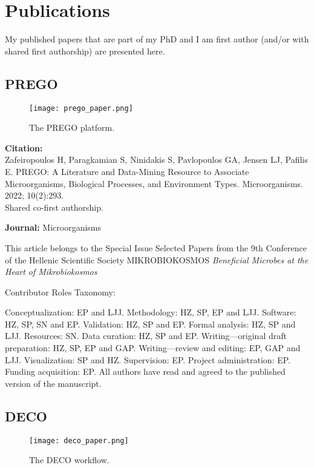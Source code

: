 \chapter{Publications}
\label{app:publications}

My published papers that are part of my PhD and I am first author (and/or with shared first authorship) are
presented here.
\section{PREGO}

\begin{figure}[hbt!] 
    \centering\texttt{[image: prego\_paper.png]}
\caption{The PREGO platform.}
    \label{fig:prego_paper}
\end{figure}

\textbf{Citation:} \\ 
Zafeiropoulos H, Paragkamian S, Ninidakis S, Pavlopoulos GA, Jensen LJ, Pafilis E. PREGO: A Literature and Data-Mining Resource to Associate Microorganisms, Biological Processes, and Environment Types. Microorganisms. 2022; 10(2):293. \\ 
Shared co-first authorship.

\textbf{Journal:} Microorganisms

This article belongs to the Special Issue Selected Papers from the 9th Conference of the Hellenic Scientific Society MIKROBIOKOSMOS \textit{Beneficial Microbes at the Heart of Mikrobiokosmos}

Contributor Roles Taxonomy:

Conceptualization: EP and LJJ.
Methodology: HZ, SP, EP and LJJ.
Software: HZ, SP, SN and EP.
Validation: HZ, SP and EP.
Formal analysis: HZ, SP and LJJ.
Resources: SN.
Data curation: HZ, SP and EP.
Writing—original draft preparation: HZ, SP, EP and GAP.
Writing—review and editing: EP, GAP and LJJ.
Visualization: SP and HZ.
Supervision: EP.
Project administration: EP.
Funding acquisition: EP.
All authors have read and agreed to the published version of the manuscript.


\section{DECO}

\begin{figure}[hbt!] 
    \centering\texttt{[image: deco\_paper.png]}
\caption{The DECO workflow.}
    \label{fig:deco_paper}
\end{figure}

